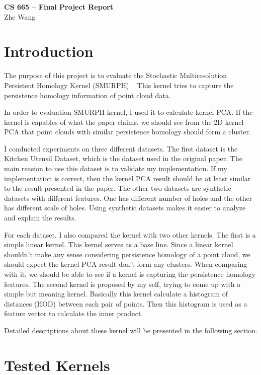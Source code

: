 \documentclass[10pt]{article}
\begin{document}
\begin{center}
    {\Large {\bf CS 665 -- Final Project Report}} \\
    Zhe Wang
    
\end{center}

\section{Introduction}

The purpose of this project is to evaluate the Stochastic Multiresolution Persistent Homology Kernel (SMURPH) ~\cite{zhu2016stochastic}
This kernel tries to capture the persistence homology information of point cloud data.

In order to evaluation SMURPH kernel, I used it to calculate kernel PCA.
If the kernel is capables of what the paper claims, we should see from the 2D kernel PCA that
point clouds with similar persistence homology should form a cluster.

I conducted experiments on three different datasets. 
The first dataset is the Kitchen Utensil Dataset, which is the dataset used in the original paper.
The main reasion to use this dataset is to validate my implementation. 
If my implementation is correct, then the kernel PCA result should be at least similar to the result presented in the paper.
The other two datasets are synthetic datasets with different features. One has different number of holes and the other has different scale of holes.
Using synthetic datasets makes it easier to analyze and explain the results.

For each dataset, I also compared the kernel with two other kernels.
The first is a simple linear kernel.
This kernel serves as a base line.
Since a linear kernel shouldn't make any sense considering persistence homology of a point cloud,
we should expect the kernel PCA result don't form any clusters.
When comparing with it, we should be able to see if a kernel is capturing the persistence homology features.
The second kernel is proposed by my self, trying to come up with a simple but meaning kernel.
Basically this kernel calculate a histogram of distances (HOD) between each pair of points.
Then this histogram is used as a feature vector to calculate the inner product.

Detailed descriptions about these kernel will be presented in the following section. 


\section{Tested Kernels}
\end{document}
